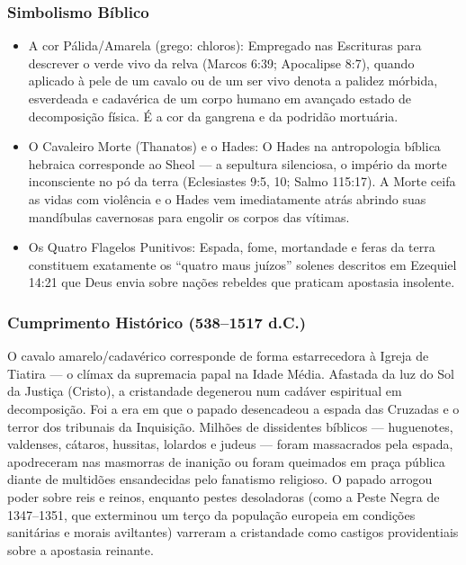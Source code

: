 \subsubsection*{Simbolismo Bíblico}
\begin{itemize}
  \item A cor Pálida/Amarela (grego: chloros): Empregado nas Escrituras para descrever o verde vivo da relva (Marcos 6:39; Apocalipse 8:7), quando aplicado à pele de um cavalo ou de um ser vivo denota a palidez mórbida, esverdeada e cadavérica de um corpo humano em avançado estado de decomposição física. É a cor da gangrena e da podridão mortuária.
  \item O Cavaleiro Morte (Thanatos) e o Hades: O Hades na antropologia bíblica hebraica corresponde ao Sheol — a sepultura silenciosa, o império da morte inconsciente no pó da terra (Eclesiastes 9:5, 10; Salmo 115:17). A Morte ceifa as vidas com violência e o Hades vem imediatamente atrás abrindo suas mandíbulas cavernosas para engolir os corpos das vítimas.
  \item Os Quatro Flagelos Punitivos: Espada, fome, mortandade e feras da terra constituem exatamente os ``quatro maus juízos'' solenes descritos em Ezequiel 14:21 que Deus envia sobre nações rebeldes que praticam apostasia insolente.
\end{itemize}



\subsubsection*{Cumprimento Histórico (538–1517 d.C.)}
O cavalo amarelo/cadavérico corresponde de forma estarrecedora à Igreja de Tiatira — o clímax da supremacia papal na Idade Média. Afastada da luz do Sol da Justiça (Cristo), a cristandade degenerou num cadáver espiritual em decomposição. Foi a era em que o papado desencadeou a espada das Cruzadas e o terror dos tribunais da Inquisição. Milhões de dissidentes bíblicos — huguenotes, valdenses, cátaros, hussitas, lolardos e judeus — foram massacrados pela espada, apodreceram nas masmorras de inanição ou foram queimados em praça pública diante de multidões ensandecidas pelo fanatismo religioso. O papado arrogou poder sobre reis e reinos, enquanto pestes desoladoras (como a Peste Negra de 1347–1351, que exterminou um terço da população europeia em condições sanitárias e morais aviltantes) varreram a cristandade como castigos providentiais sobre a apostasia reinante.



